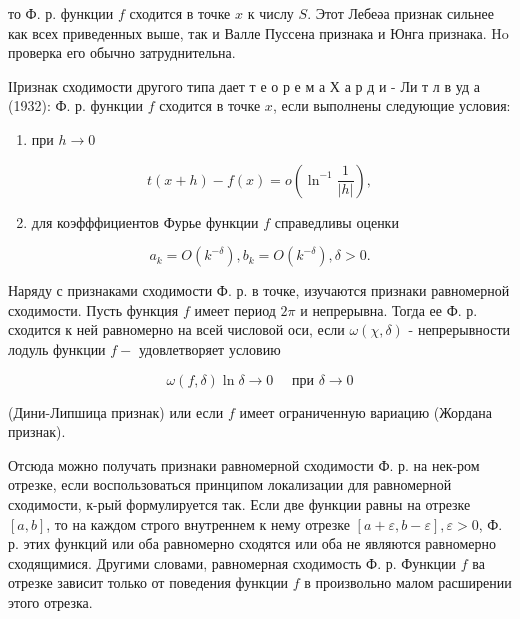 \documentclass[10pt]{article}
\begin{document}
то Ф. р. функции $f$ сходится в точке $x$ к числу $S$. Этот Лебеәа признак сильнее как всех приведенных выше, так и Валле Пуссена признака и Юнга признака. Ho проверка его обычно затруднительна.



ІІризнак сходимости другого типа дает т е о р е м а Х а р д и - Ли т л в уд а (1932): Ф. р. функции $f$ сходится в точке $x$, если выполнены следующие условия:



\begin{enumerate}

  \item при $h \rightarrow 0$

\end{enumerate}



\[

t(x+h)-f(x)=o\left(\ln ^{-1} \frac{1}{|h|}\right),

\]



\begin{enumerate}

  \setcounter{enumi}{1}

  \item для коэфффициентов Фурье функции $f$ справедливы оценки

\end{enumerate}



\[

a_{k}=O\left(k^{-\delta}\right), b_{k}=O\left(k^{-\delta}\right), \delta>0 .

\]



Наряду с признаками сходимости Ф. р. в точке, изучаются признаки равномерной сходимости. Пусть функция $f$ имеет период $2 \pi$ и непрерывна. Тогда ее Ф. р. сходится к ней равномерно на всей числовой оси, если $\omega(\chi, \delta)$ - непрерывности лодуль функции $f-$ удовлетворяет условию



\[

\omega(f, \delta) \ln \delta \longrightarrow 0 \quad \text { при } \delta \longrightarrow 0

\]



(Дини-Липшица признак) или если $f$ имеет ограниченную вариацию (Жордана признак).



Отсюда можно получать признаки равномерной сходимости Ф. р. на нек-ром отрезке, если воспользоваться принципом локализации для равномерной сходимости, к-рый формулируется так. Если две функции равны на отрезке $[a, b]$, то на каждом строго внутреннем к нему отрезке $[a+\varepsilon, b-\varepsilon], \varepsilon>0$, Ф. р. этих функций или оба равномерно сходятся или оба не являются равномерно сходящимися. Другими словами, равномерная сходимость Ф. р. Функции $f$ ва отрезке зависит только от поведения функции $f$ в произвольно малом расширении этого отрезка.
\end{document}
